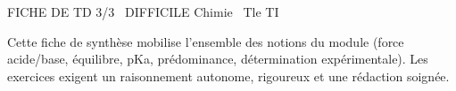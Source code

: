 \documentclass[11pt]{article}
\begin{document}
\begin{tcolorbox}[enhanced,colback=popink,colframe=popink,arc=10pt,boxrule=0pt,left=12pt,right=12pt,top=9pt,bottom=9pt]
{\color{white}\popxbold\small FICHE DE TD 3/3 \textbullet\ DIFFICILE \hfill Chimie \textbullet\ Tle TI\par}
\end{tcolorbox}
\vspace{4pt}
\noindent Cette fiche de synthèse mobilise l'ensemble des notions du module (force acide/base, équilibre, pKa, prédominance, détermination expérimentale). Les exercices exigent un raisonnement autonome, rigoureux et une rédaction soignée.
\end{document}
